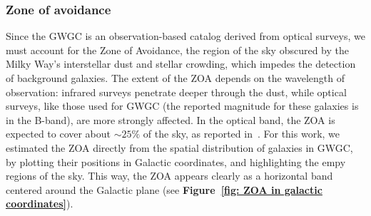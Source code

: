 \subsubsection{Zone of avoidance}
Since the GWGC is an observation-based catalog derived from optical surveys, we must account for the Zone of Avoidance, the region of the sky obscured by the Milky Way’s interstellar dust and stellar crowding, which impedes the detection of background galaxies.
The extent of the ZOA depends on the wavelength of observation: infrared surveys penetrate deeper through the dust, while optical surveys, like those used for GWGC (the reported magnitude for these galaxies is in the B-band), are more strongly affected. 
In the optical band, the ZOA is expected to cover about $\sim25\%$ of the sky, as reported in~\cite{Kraan-Korteweg}.
For this work, we estimated the ZOA directly from the spatial distribution of galaxies in GWGC, by plotting their positions in Galactic coordinates, and highlighting the empy regions of the sky. 
This way, the ZOA appears clearly as a horizontal band centered around the Galactic plane (see \textbf{Figure~\ref{fig: ZOA in galactic coordinates}}).
